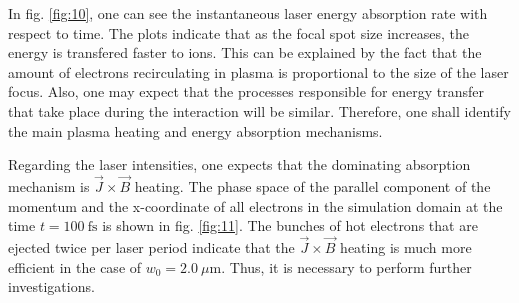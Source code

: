 In fig. \ref{fig:10}, one can see the instantaneous laser energy absorption rate with respect to time. The plots indicate that as the focal spot size increases, the energy is transfered faster to ions. This can be explained by the fact that the amount of electrons recirculating in plasma is proportional to the size of the laser focus. Also, one may expect that the processes responsible for energy transfer that take place during the interaction will be similar. Therefore, one shall identify the main plasma heating and energy absorption mechanisms.

Regarding the laser intensities, one expects that the dominating absorption mechanism is $ \vec{J} \times \vec{B} $ heating. The phase space of the parallel component of the momentum and the x-coordinate of all electrons in the simulation domain at the time $ t = 100 \ \mathrm{fs} $ is shown in fig. \ref{fig:11}. The bunches of hot electrons that are ejected twice per laser period indicate that the $ \vec{J} \times \vec{B} $ heating is much more efficient in the case of $ w_0 = 2.0 \ \mu\mathrm{m} $. Thus, it is necessary to perform further investigations.

 

